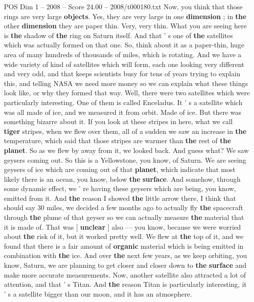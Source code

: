 \begin{textsample}{POS Dim 1 – 2008 – Score 24.00 – 2008/t000180.txt}
Now, you think that those rings are very large \textbf{objects}.
Yes, they are very large in one \textbf{dimension} ; in \textbf{the} other \textbf{dimension} they are paper thin.
Very, very thin.
What you are seeing here is \textbf{the} shadow of \textbf{the} ring on Saturn itself.
And that ' s one of \textbf{the} satellites which was actually formed on that one.
So, think about it as a paper-thin, huge area of many hundreds of thousands of miles, which is rotating.
And we have a wide variety of kind of satellites which will form, each one looking very different and very odd, and that keeps scientists busy for tens of years trying to explain this, and telling NASA we need more money so we can explain what these things look like, or why they formed that way.
Well, there were two satellites which were particularly interesting.
One of them is called Enceladus.
It ' s a satellite which was all made of ice, and we measured it from orbit.
Made of ice.
But there was something bizarre about it.
If you look at these stripes in here, what we call \textbf{tiger} stripes, when we flew over them, all of a sudden we saw an increase in \textbf{the} temperature, which said that those stripes are warmer than \textbf{the} rest of \textbf{the} \textbf{planet}.
So as we flew by away from it, we looked back.
And guess what?
We saw geysers coming out.
So this is a Yellowstone, you know, of Saturn.
We are seeing geysers of ice which are coming out of that \textbf{planet}, which indicate that most likely there is an ocean, you know, below \textbf{the} \textbf{surface}.
And somehow, through some dynamic effect, we ' re having these geysers which are being, you know, emitted from it.
And \textbf{the} reason I showed \textbf{the} little arrow there, I think that should say 30 miles, we decided a few months ago to actually fly \textbf{the} spacecraft through \textbf{the} plume of that geyser so we can actually measure \textbf{the} material that it is made of.
That was [ \textbf{unclear} ] also — you know, because we were worried about \textbf{the} risk of it, but it worked pretty well.
We flew at \textbf{the} top of it, and we found that there is a fair amount of \textbf{organic} material which is being emitted in combination with \textbf{the} ice.
And over \textbf{the} next few years, as we keep orbiting, you know, Saturn, we are planning to get closer and closer down to \textbf{the} \textbf{surface} and make more accurate measurements.
Now, another satellite also attracted a lot of attention, and that ' s Titan.
And \textbf{the} reason Titan is particularly interesting, it ' s a satellite bigger than our moon, and it has an atmosphere.

\end{textsample}
